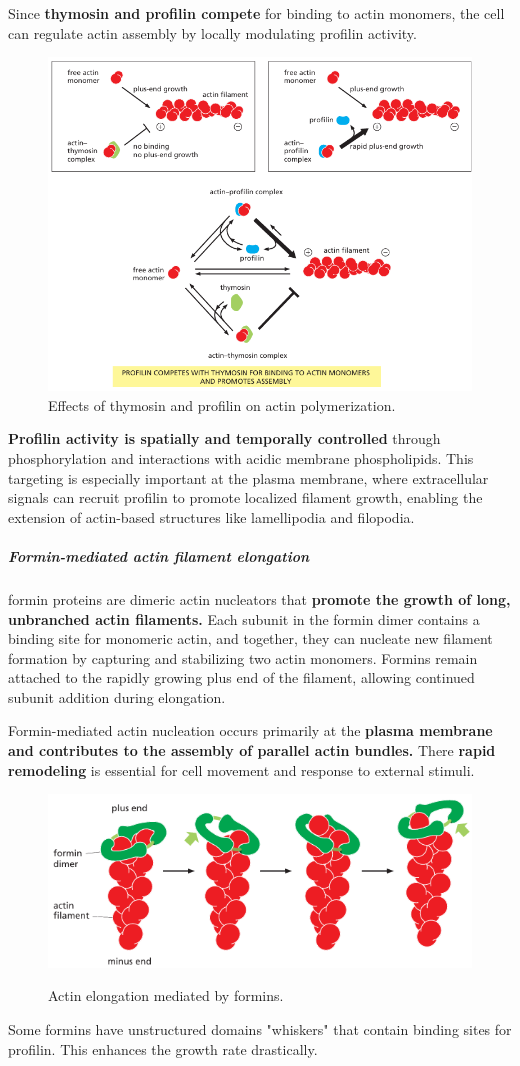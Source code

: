 \documentclass[../main.tex]{subfiles}
\begin{document}
Since \textbf{thymosin and profilin compete} for binding to actin monomers, the cell can regulate actin assembly by locally modulating profilin activity.

\begin{figure}[H]
	\centering
	\includegraphics[width = 0.65 \textwidth]{9}
	\caption{ Effects of thymosin and profilin on actin polymerization.}
\end{figure}

\textbf{Profilin activity is spatially and temporally controlled} through phosphorylation and interactions with acidic membrane phospholipids. This targeting is especially important at the plasma membrane, where extracellular signals can recruit profilin to promote localized filament growth, enabling the extension of actin-based structures like lamellipodia and filopodia.

\subparagraph{Formin-mediated actin filament elongation}
\gls{formin} proteins are dimeric actin nucleators that \textbf{promote the growth of long, unbranched actin filaments.} Each subunit in the formin dimer contains a binding site for monomeric actin, and together, they can nucleate new filament formation by capturing and stabilizing two actin monomers. Formins remain attached to the rapidly growing plus end of the filament, allowing continued subunit addition during elongation. 

Formin-mediated actin nucleation occurs primarily at the \textbf{plasma membrane and contributes to the assembly of parallel actin bundles.} There \textbf{rapid remodeling} is essential for cell movement and response to external stimuli.
\begin{figure}[H]
	\centering
	\includegraphics[width = 0.6 \textwidth]{11}
	\label{fig:arp2-3-nucleation}
	\caption{Actin elongation mediated by formins.}
\end{figure}
Some formins have unstructured domains "whiskers" that contain binding sites for profilin. This enhances the growth rate drastically.
\end{document}
